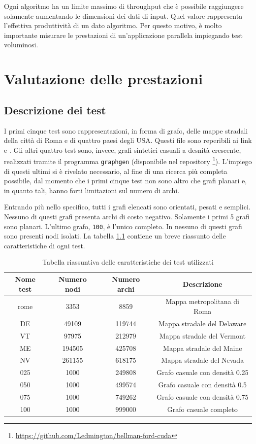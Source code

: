 \documentclass[12pt,a4paper,oneside]{book}
\begin{document}
	Ogni algoritmo ha un limite massimo di throughput che è possibile raggiungere solamente aumentando le dimensioni dei dati di input. Quel valore rappresenta l'effettiva produttività di un dato algoritmo. Per questo motivo, è molto importante misurare le prestazioni di un'applicazione parallela impiegando test voluminosi.
	
	\chapter{Valutazione delle prestazioni}
	\label{chap:perf}
	\section{Descrizione dei test}
	I primi cinque test sono rappresentazioni, in forma di grafo, delle mappe stradali della città di Roma e di quattro paesi degli USA. Questi file sono reperibili ai link \cite{testUSA} e \cite{testRoma}. Gli altri quattro test sono, invece, grafi sintetici casuali a desnità crescente, realizzati tramite il programma \texttt{graphgen} (disponibile nel repository \footnote{\url{https://github.com/Ledmington/bellman-ford-cuda}}). L'impiego di questi ultimi si è rivelato necessario, al fine di una ricerca più completa possibile, dal momento che i primi cinque test non sono altro che grafi planari e, in quanto tali, hanno forti limitazioni sul numero di archi.
	
	Entrando più nello specifico, tutti i grafi elencati sono orientati, pesati e semplici. Nessuno di questi grafi presenta archi di costo negativo. Solamente i primi 5 grafi sono planari. L'ultimo grafo, \texttt{100}, è l'unico completo. In nessuno di questi grafi sono presenti nodi isolati. La tabella \ref{tab:riassunto_test} contiene un breve riassunto delle caratteristiche di ogni test.
	\begin{table}[!ht]
		\centering
		\begin{tabular}{|c|c|c|c|}
			\hline
			\textbf{Nome test} & \textbf{Numero nodi} & \textbf{Numero archi} & \textbf{Descrizione} \\ \hline
			rome & 3353 & 8859 & Mappa metropolitana di Roma \\ \hline
			DE & 49109 & 119744 & Mappa stradale del Delaware \\ \hline
			VT & 97975 & 212979 & Mappa stradale del Vermont \\ \hline
			ME & 194505 & 425708 & Mappa stradale del Maine \\ \hline
			NV & 261155 & 618175 & Mappa stradale del Nevada \\ \hline
			025 & 1000 & 249808 & Grafo casuale con densità 0.25 \\ \hline
			050 & 1000 & 499574 & Grafo casuale con densità 0.5 \\ \hline
			075 & 1000 & 749262 & Grafo casuale con densità 0.75 \\ \hline
			100 & 1000 & 999000 & Grafo casuale completo \\ \hline
		\end{tabular}
		\caption{Tabella riassuntiva delle caratteristiche dei test utilizzati}
		\label{tab:riassunto_test}
	\end{table}
	
\end{document}
